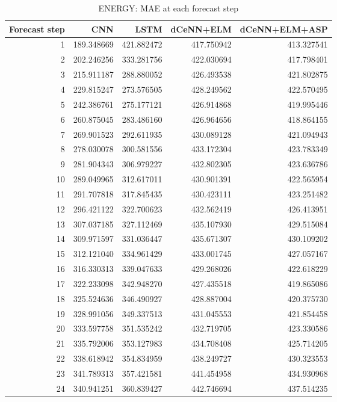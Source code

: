 \begin{table}
\caption{ENERGY: MAE at each forecast step}
\begin{tabular}{rrrrr}
\toprule
Forecast step & CNN & LSTM & dCeNN+ELM & dCeNN+ELM+ASP \\
\midrule
1 & 189.348669 & 421.882472 & 417.750942 & 413.327541 \\
2 & 202.246256 & 333.281756 & 422.030694 & 417.798401 \\
3 & 215.911187 & 288.880052 & 426.493538 & 421.802875 \\
4 & 229.815247 & 273.576505 & 428.249562 & 422.570495 \\
5 & 242.386761 & 275.177121 & 426.914868 & 419.995446 \\
6 & 260.875045 & 283.486160 & 426.964656 & 418.864155 \\
7 & 269.901523 & 292.611935 & 430.089128 & 421.094943 \\
8 & 278.030078 & 300.581556 & 433.172304 & 423.783349 \\
9 & 281.904343 & 306.979227 & 432.802305 & 423.636786 \\
10 & 289.049965 & 312.617011 & 430.901391 & 422.565954 \\
11 & 291.707818 & 317.845435 & 430.423111 & 423.251482 \\
12 & 296.421122 & 322.700623 & 432.562419 & 426.413951 \\
13 & 307.037185 & 327.112469 & 435.107930 & 429.515084 \\
14 & 309.971597 & 331.036447 & 435.671307 & 430.109202 \\
15 & 312.121040 & 334.961429 & 433.001745 & 427.057167 \\
16 & 316.330313 & 339.047633 & 429.268026 & 422.618229 \\
17 & 322.233098 & 342.948270 & 427.435518 & 419.865086 \\
18 & 325.524636 & 346.490927 & 428.887004 & 420.375730 \\
19 & 328.991056 & 349.337513 & 431.045553 & 421.854458 \\
20 & 333.597758 & 351.535242 & 432.719705 & 423.330586 \\
21 & 335.792006 & 353.127983 & 434.708408 & 425.714205 \\
22 & 338.618942 & 354.834959 & 438.249727 & 430.323553 \\
23 & 341.789313 & 357.421581 & 441.454958 & 434.930968 \\
24 & 340.941251 & 360.839427 & 442.746694 & 437.514235 \\

\end{tabular}
\end{table}
